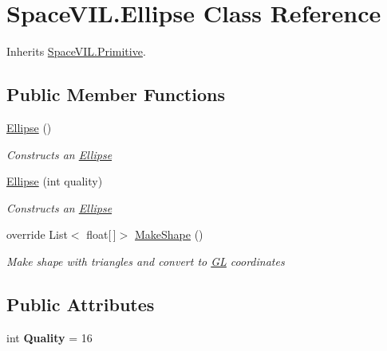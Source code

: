 \hypertarget{class_space_v_i_l_1_1_ellipse}{}\section{Space\+V\+I\+L.\+Ellipse Class Reference}
\label{class_space_v_i_l_1_1_ellipse}


Inherits \mbox{\hyperlink{class_space_v_i_l_1_1_primitive}{Space\+V\+I\+L.\+Primitive}}.

\subsection*{Public Member Functions}
\begin{DoxyCompactItemize}
\item 
\mbox{\hyperlink{class_space_v_i_l_1_1_ellipse_a33ed4c5c8bbdb3a3fe9001292dc7b58e}{Ellipse}} ()
\begin{DoxyCompactList}\small\item\em Constructs an \mbox{\hyperlink{class_space_v_i_l_1_1_ellipse}{Ellipse}} \end{DoxyCompactList}\item 
\mbox{\hyperlink{class_space_v_i_l_1_1_ellipse_a972b5c63aba04b84274f5048351a851a}{Ellipse}} (int quality)
\begin{DoxyCompactList}\small\item\em Constructs an \mbox{\hyperlink{class_space_v_i_l_1_1_ellipse}{Ellipse}} \end{DoxyCompactList}\item 
override List$<$ float\mbox{[}$\,$\mbox{]}$>$ \mbox{\hyperlink{class_space_v_i_l_1_1_ellipse_aa2311fd87e9a988eca0d754ad6e9093d}{Make\+Shape}} ()
\begin{DoxyCompactList}\small\item\em Make shape with triangles and convert to \mbox{\hyperlink{namespace_g_l}{GL}} coordinates \end{DoxyCompactList}\end{DoxyCompactItemize}
\subsection*{Public Attributes}
\begin{DoxyCompactItemize}
\item 
\mbox{\label{class_space_v_i_l_1_1_ellipse_acd5d2d2d328d5463759a1f8528d7640b}} 
int {\bfseries Quality} = 16
\end{DoxyCompactItemize}
